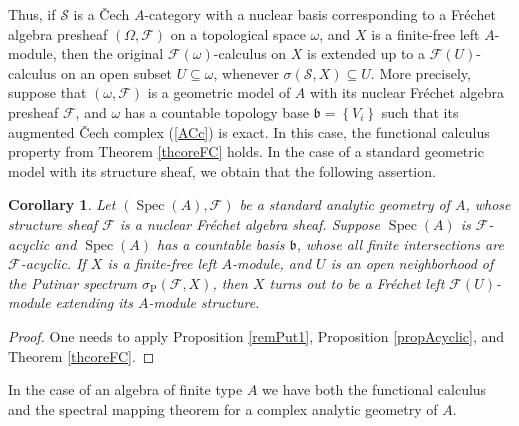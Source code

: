 \documentclass[12pt]{amsart}%
\theoremstyle{plain}
\newtheorem{corollary}{Corollary}
\numberwithin{equation}{section}
\numberwithin{equation}{section}
\numberwithin{theorem}{section}
\numberwithin{lemma}{section}
\numberwithin{remark}{section}
\numberwithin{example}{section}
\numberwithin{proposition}{section}
\numberwithin{definition}{section}
\numberwithin{corollary}{section}
\begin{document}
Thus, if $\mathcal{S}$ is a \v{C}ech $A$-category with a nuclear basis
corresponding to a Fr\'{e}chet algebra presheaf $\left(  \Omega,\mathcal{F}%
\right)  $ on a topological space $\omega$, and $X$ is a finite-free left
$A$-module, then the original $\mathcal{F}\left(  \omega\right)  $-calculus on
$X$ is extended up to a $\mathcal{F}\left(  U\right)  $-calculus on an open
subset $U\subseteq\omega$, whenever $\sigma\left(  \mathcal{S},X\right)
\subseteq U$. More precisely, suppose that $\left(  \omega,\mathcal{F}\right)
$ is a geometric model of $A$ with its nuclear Fr\'{e}chet algebra presheaf
$\mathcal{F}$, and $\omega$ has a countable topology base $\mathfrak{b}%
=\left\{  V_{i}\right\}  $ such that its augmented \v{C}ech complex
(\ref{ACc}) is exact. In this case, the functional calculus property from
Theorem \ref{thcoreFC} holds. In the case of a standard geometric model with
its structure sheaf, we obtain that the following assertion.

\begin{corollary}
\label{corkeyy1}Let $\left(  \operatorname{Spec}\left(  A\right)
,\mathcal{F}\right)  $ be a standard analytic geometry of $A$, whose structure
sheaf $\mathcal{F}$ is a nuclear Fr\'{e}chet algebra sheaf. Suppose
$\operatorname{Spec}\left(  A\right)  $ is $\mathcal{F}$-acyclic and
$\operatorname{Spec}\left(  A\right)  $ has a countable basis $\mathfrak{b}$,
whose all finite intersections are $\mathcal{F}$-acyclic. If $X$ is a
finite-free left $A$-module, and $U$ is an open neighborhood of the Putinar
spectrum $\sigma_{\operatorname{P}}\left(  \mathcal{F},X\right)  $, then $X$
turns out to be a Fr\'{e}chet left $\mathcal{F}\left(  U\right)  $-module
extending its $A$-module structure.
\end{corollary}

\begin{proof}
One needs to apply Proposition \ref{remPut1}, Proposition \ref{propAcyclic},
and Theorem \ref{thcoreFC}.
\end{proof}

In the case of an algebra of finite type $A$ we have both the functional
calculus and the spectral mapping theorem for a complex analytic geometry of
$A$.
\end{document}

